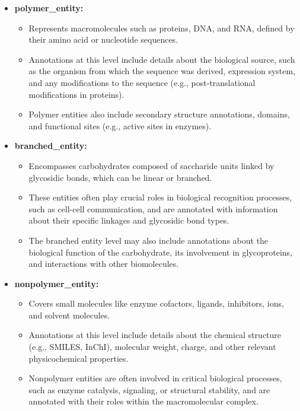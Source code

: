 \begin{itemize}
\item
  \textbf{polymer\_entity:}

  \begin{itemize}
  \tightlist
  \item
    Represents macromolecules such as proteins, DNA, and RNA, defined by their amino acid or nucleotide sequences.
  \item
    Annotations at this level include details about the biological source, such as the organism from which the sequence was derived, expression system, and any modifications to the sequence (e.g., post-translational modifications in proteins).
  \item
    Polymer entities also include secondary structure annotations, domains, and functional sites (e.g., active sites in enzymes).
  \end{itemize}
\item
  \textbf{branched\_entity:}

  \begin{itemize}
  \tightlist
  \item
    Encompasses carbohydrates composed of saccharide units linked by glycosidic bonds, which can be linear or branched.
  \item
    These entities often play crucial roles in biological recognition processes, such as cell-cell communication, and are annotated with information about their specific linkages and glycosidic bond types.
  \item
    The branched entity level may also include annotations about the biological function of the carbohydrate, its involvement in glycoproteins, and interactions with other biomolecules.
  \end{itemize}
\item
  \textbf{nonpolymer\_entity:}

  \begin{itemize}
  \tightlist
  \item
    Covers small molecules like enzyme cofactors, ligands, inhibitors, ions, and solvent molecules.
  \item
    Annotations at this level include details about the chemical structure (e.g., SMILES, InChI), molecular weight, charge, and other relevant physicochemical properties.
  \item
    Nonpolymer entities are often involved in critical biological processes, such as enzyme catalysis, signaling, or structural stability, and are annotated with their roles within the macromolecular complex.
  \end{itemize}
\end{itemize}

